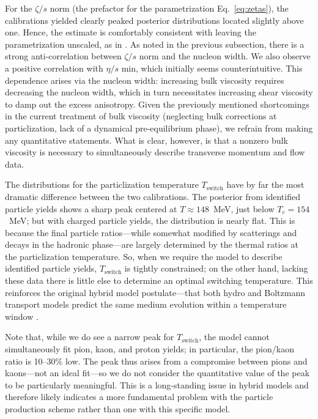 \documentclass[aps,prc,reprint,amsmath,nofootinbib]{revtex4-1}
\begin{document}
For the $\zeta/s$ norm (the prefactor for the parametrization Eq.~\eqref{eq:zetas}), the calibrations yielded clearly peaked posterior distributions located slightly above one.
Hence, the estimate is comfortably consistent with leaving the parametrization unscaled, as in \cite{Ryu:2015vwa}.
As noted in the previous subsection, there is a strong anti-correlation between $\zeta/s$ norm and the nucleon width.
We also observe a positive correlation with $\eta/s$ min, which initially seems counterintuitive.
This dependence arises via the nucleon width:
increasing bulk viscosity requires decreasing the nucleon width, which in turn necessitates increasing shear viscosity to damp out the excess anisotropy.
Given the previously mentioned shortcomings in the current treatment of bulk viscosity (neglecting bulk corrections at particlization, lack of a dynamical pre-equilibrium phase), we refrain from making any quantitative statements.
What is clear, however, is that a nonzero bulk viscosity is necessary to simultaneously describe transverse momentum and flow data.

The distributions for the particlization temperature $T_\text{switch}$ have by far the most dramatic difference between the two calibrations.
The posterior from identified particle yields shows a sharp peak centered at $T \approx 148$~MeV, just below $T_c = 154$~MeV;
but with charged particle yields, the distribution is nearly flat.
This is because the final particle ratios---while somewhat modified by scatterings and decays in the hadronic phase---are largely determined by the thermal ratios at the particlization temperature.
So, when we require the model to describe identified particle yields, $T_\text{switch}$ is tightly constrained;
on the other hand, lacking these data there is little else to determine an optimal switching temperature.
This reinforces the original hybrid model postulate---that both hydro and Boltzmann transport models predict the same medium evolution within a temperature window \cite{Bass:2000ib,Nonaka:2006yn,Petersen:2008dd}.

Note that, while we do see a narrow peak for $T_\text{switch}$, the model cannot simultaneously fit pion, kaon, and proton yields;
in particular, the pion/kaon ratio is 10--30\% low.
The peak thus arises from a compromise between pions and kaons---not an ideal fit---so we do not consider the quantitative value of the peak to be particularly meaningful.
This is a long-standing issue in hybrid models \cite{Song:2013qma} and therefore likely indicates a more fundamental problem with the particle production scheme rather than one with this specific model.
\end{document}
